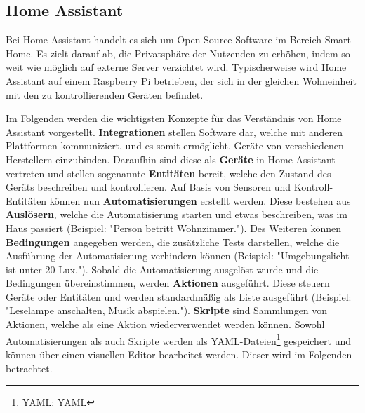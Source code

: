 \subsection{Home Assistant}

Bei Home Assistant handelt es sich um Open Source Software im Bereich Smart Home. Es zielt darauf
ab, die Privatsphäre der Nutzenden zu erhöhen, indem so weit wie möglich auf externe Server
verzichtet wird. Typischerweise wird Home Assistant auf einem Raspberry Pi betrieben, der sich in
der gleichen Wohneinheit  mit den zu kontrollierenden Geräten befindet.
\parencite{homeassistantHomeAssistant}

Im Folgenden werden die wichtigsten Konzepte für das Verständnis von Home Assistant vorgestellt.
\textbf{Integrationen} stellen Software dar, welche mit anderen Plattformen kommuniziert, und es
somit ermöglicht, Geräte von verschiedenen Herstellern einzubinden. Daraufhin sind diese als
\textbf{Geräte} in Home Assistant vertreten und stellen sogenannte \textbf{Entitäten} bereit, welche
den Zustand des Geräts beschreiben und kontrollieren. Auf Basis von Sensoren und Kontroll-Entitäten
können nun \textbf{Automatisierungen} erstellt werden. Diese bestehen aus \textbf{Auslösern}, welche
die Automatisierung starten und etwas beschreiben, was im Haus passiert (Beispiel: "Person
betritt Wohnzimmer."). Des Weiteren können \textbf{Bedingungen} angegeben werden, die zusätzliche
Tests darstellen, welche die Ausführung der Automatisierung verhindern können (Beispiel:
"Umgebungslicht ist unter 20 Lux."). Sobald die Automatisierung ausgelöst wurde und die Bedingungen
übereinstimmen, werden \textbf{Aktionen} ausgeführt. Diese steuern Geräte oder Entitäten und werden
standardmäßig als Liste ausgeführt (Beispiel: "Leselampe anschalten, Musik abspielen.").
\textbf{Skripte} sind Sammlungen von Aktionen, welche als eine Aktion wiederverwendet werden können.
\parencite{homeassistantConceptsTerminology} Sowohl Automatisierungen als auch Skripte werden als
\acs{YAML}-Dateien\footnote{\acs{YAML}: \acl{YAML}} gespeichert und können über einen visuellen
Editor bearbeitet werden. Dieser wird im Folgenden betrachtet.

